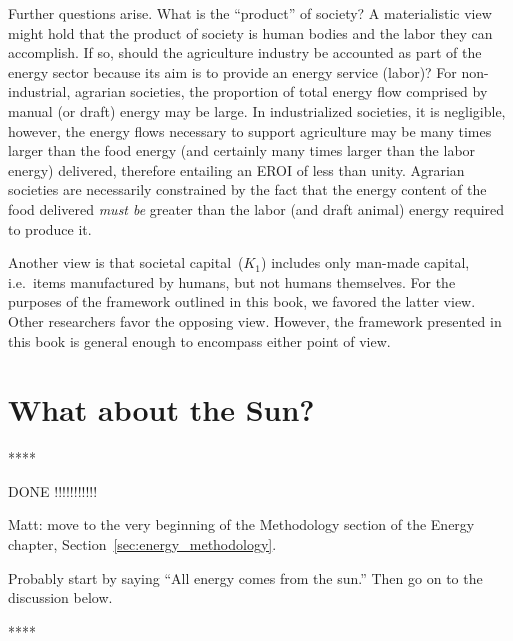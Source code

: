 Further questions arise. 
What is the ``product'' of society? 
A materialistic view might hold that the product of
society is human bodies and the labor they can accomplish. 
If so, 
should the agriculture industry 
be accounted as part of the energy sector 
because its aim is to provide 
an energy service (labor)? 
For non-industrial, agrarian societies, 
the proportion of total energy flow 
comprised by manual (or draft) energy 
may be large. 
In industrialized societies, 
it is negligible, 
however, 
the energy flows necessary to support agriculture
may be many times larger than the food energy
(and certainly many times larger 
than the labor energy) 
delivered, therefore entailing an EROI of less than unity. 
Agrarian societies are necessarily constrained 
by the fact that the energy content of the food delivered 
\emph{must be} greater than the labor (and draft animal) 
energy required to produce it.

Another view is that societal capital~($K_{1}$) 
includes only man-made capital, 
i.e.\ items manufactured by humans,
but not humans themselves. 
For the purposes of the framework outlined in this book, 
we favored the latter view.
Other researchers favor the opposing view.\cite{Giampietro2013}
However,
the framework presented in this book is general enough to encompass either point of view.


\section{What about the Sun?}
\label{sec:emergy}

****

DONE !!!!!!!!!!!

Matt: move to the very beginning of the Methodology
section of the Energy chapter, Section~\ref{sec:energy_methodology}.

Probably start by saying ``All energy comes from the sun.''
Then go on to the discussion below.

****

